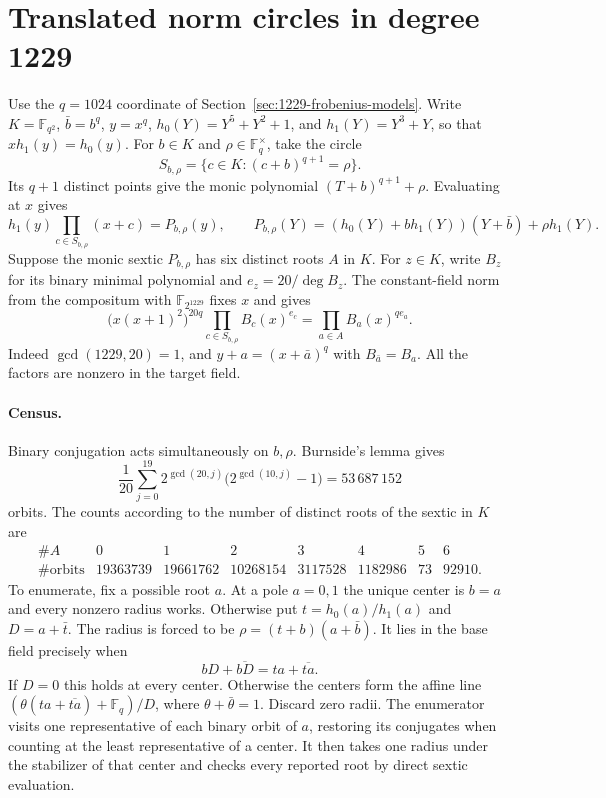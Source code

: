 \documentclass[11pt]{article}
\begin{document}
\section{Translated norm circles in degree 1229}\label{sec:translated-circles}
Use the \(q=1024\) coordinate of Section~\ref{sec:1229-frobenius-models}.
Write \(K=\mathbb F_{q^2}\), \(\bar b=b^q\), \(y=x^q\),
\(h_0(Y)=Y^5+Y^2+1\), and \(h_1(Y)=Y^3+Y\), so that \(x h_1(y)=h_0(y)\).
For \(b\in K\) and \(\rho\in\mathbb F_q^\times\), take the circle
\[
 S_{b,\rho}=\{c\in K:(c+b)^{q+1}=\rho\}.
\]
Its \(q+1\) distinct points give the monic polynomial
\((T+b)^{q+1}+\rho\). Evaluating at \(x\) gives
\[
 h_1(y)\prod_{c\in S_{b,\rho}}(x+c)=P_{b,\rho}(y),\qquad
 P_{b,\rho}(Y)=(h_0(Y)+b h_1(Y))(Y+\bar b)+\rho h_1(Y).
\]
Suppose the monic sextic \(P_{b,\rho}\) has six distinct roots \(A\)
in \(K\). For \(z\in K\), write \(B_z\) for its binary minimal polynomial
and \(e_z=20/\deg B_z\). The constant-field norm from the compositum
with \(\mathbb F_{2^{1229}}\) fixes \(x\) and gives
\[
 \bigl(x(x+1)^2\bigr)^{20q}
       \prod_{c\in S_{b,\rho}} B_c(x)^{e_c}
       = \prod_{a\in A} B_a(x)^{q e_a}.
\]
Indeed \(\gcd(1229,20)=1\), and \(y+a=(x+\bar a)^q\) with
\(B_{\bar a}=B_a\). All the factors are nonzero in the target field.

\paragraph{Census.}
Binary conjugation acts simultaneously on \(b,\rho\). Burnside's
lemma gives
\[
 \frac1{20}\sum_{j=0}^{19}2^{\gcd(20,j)}
          \bigl(2^{\gcd(10,j)}-1\bigr)=53\,687\,152
\]
orbits. The counts according to the number of distinct roots of the
sextic in \(K\) are
\[
\begin{array}{c|rrrrrrr}
\#A&0&1&2&3&4&5&6\\ \hline
\#\text{orbits}&19363739&19661762&10268154&3117528&1182986&73&92910 .
\end{array}
\]
To enumerate, fix a possible root \(a\). At a pole \(a=0,1\) the
unique center is \(b=a\) and every nonzero radius works. Otherwise put
\(t=h_0(a)/h_1(a)\) and \(D=a+\bar t\). The radius is forced to be
\(\rho=(t+b)(a+\bar b)\). It lies in the base field precisely when
\[
     bD+\overline{bD}=ta+\overline{ta}.
\]
If \(D=0\) this holds at every center. Otherwise the centers form
the affine line \((\theta(ta+\overline{ta})+\mathbb F_q)/D\),
where \(\theta+\bar\theta=1\). Discard zero radii. The enumerator
visits one representative of each binary orbit of \(a\), restoring
its conjugates when counting at the least representative of a center.
It then takes one radius under the stabilizer of that center and
checks every reported root by direct sextic evaluation.
\end{document}
